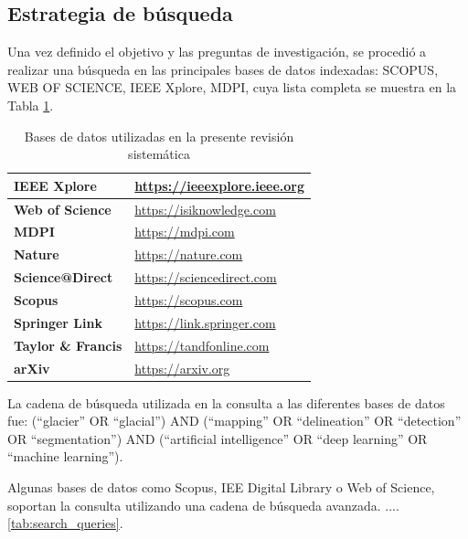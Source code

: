 \documentclass{article}
\begin{document}
\subsection{Estrategia de búsqueda}

Una vez definido el objetivo y las preguntas de investigación, se procedió a realizar una búsqueda en las principales bases de datos indexadas:  SCOPUS, WEB OF SCIENCE, IEEE Xplore, MDPI, cuya lista completa se muestra en la Tabla \ref{tab:databases}.

\begin{table}[H]
    \centering
    \caption{Bases de datos utilizadas en la presente revisión sistemática}
    \hspace{1cm}
    \label{tab:databases}
    \begin{tabularx}{\textwidth}{XX}
        \hline
        \textbf{IEEE Xplore}       & \url{https://ieeexplore.ieee.org} \\ \hline
        \textbf{Web of Science}    & \url{https://isiknowledge.com}    \\ \hline
        \textbf{MDPI}              & \url{https://mdpi.com}            \\ \hline
        \textbf{Nature}            & \url{https://nature.com}          \\ \hline
        \textbf{Science@Direct}    & \url{https://sciencedirect.com}   \\ \hline
        \textbf{Scopus}            & \url{https://scopus.com}          \\ \hline
        \textbf{Springer Link}     & \url{https://link.springer.com}   \\ \hline
        \textbf{Taylor \& Francis} & \url{https://tandfonline.com}     \\ \hline
        \textbf{arXiv}             & \url{https://arxiv.org}           \\ \hline
    \end{tabularx}
\end{table}

La cadena de búsqueda utilizada en la consulta a las diferentes bases de datos fue: (“glacier” OR “glacial”) AND (“mapping” OR “delineation” OR “detection” OR “segmentation”) AND (“artificial intelligence” OR “deep learning” OR “machine learning”).

Algunas bases de datos como Scopus, IEE Digital Library o Web of Science, soportan la consulta utilizando una cadena de búsqueda avanzada. .... \ref{tab:search_queries}.
\end{document}
